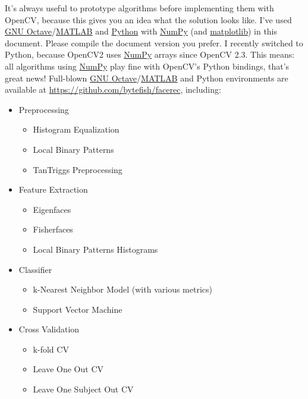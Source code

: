 It's always useful to prototype algorithms before implementing them with OpenCV, because this gives you an idea what the solution looks like. I've used \href{http://www.gnu.org/software/octave/}{GNU Octave}/\href{http://www.mathworks.com}{MATLAB} and \href{http://www.python.org}{Python} with \href{http://www.scipy.org}{NumPy} (and \href{http://matplotlib.sourceforge.net/}{matplotlib}) in this document. Please compile the document version you prefer. I recently switched to Python, because OpenCV2 uses \href{http://www.scipy.org}{NumPy} arrays since OpenCV 2.3. This means: all algorithms using \href{http://www.numpy.org}{NumPy} play fine with OpenCV's Python bindings, that's great news! Full-blown \href{http://www.gnu.org/software/octave/}{GNU Octave}/\href{http://www.mathworks.com}{MATLAB} and Python environments are available at \url{https://github.com/bytefish/facerec}, including:
\begin{itemize}
	\item Preprocessing 
	\begin{itemize}
		\item Histogram Equalization
		\item Local Binary Patterns
		\item TanTriggs Preprocessing \cite{Tan10}
	\end{itemize}
	\item Feature Extraction
	\begin{itemize}
		\item Eigenfaces \cite{PT91}
		\item Fisherfaces \cite{belhumeru97}
		\item Local Binary Patterns Histograms \cite{Ahonen04}
	\end{itemize}
	\item Classifier
		\begin{itemize}
			\item k-Nearest Neighbor Model (with various metrics)
			\item Support Vector Machine \cite{Vapnik1998}
		\end{itemize}
	\item Cross Validation
	\begin{itemize}
		\item k-fold CV 
		\item Leave One Out CV
		\item Leave One Subject Out CV
	\end{itemize}
\end{itemize}

